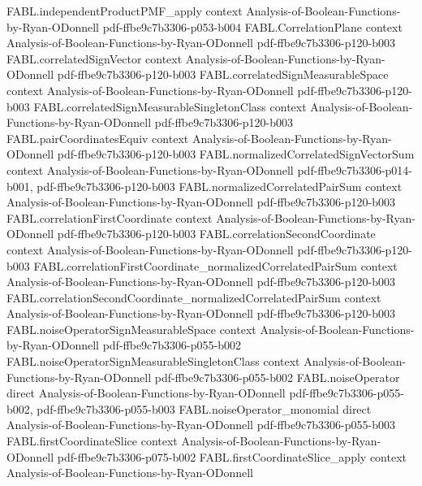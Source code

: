 \begin{theorem}
  {FABL.independentProductPMF_apply}
  {context}
  {Analysis-of-Boolean-Functions-by-Ryan-ODonnell}
  {pdf-ffbe9c7b3306-p053-b004}
\proofstep
  {FABL.CorrelationPlane}
  {context}
  {Analysis-of-Boolean-Functions-by-Ryan-ODonnell}
  {pdf-ffbe9c7b3306-p120-b003}
\proofstep
  {FABL.correlatedSignVector}
  {context}
  {Analysis-of-Boolean-Functions-by-Ryan-ODonnell}
  {pdf-ffbe9c7b3306-p120-b003}
\proofstep
  {FABL.correlatedSignMeasurableSpace}
  {context}
  {Analysis-of-Boolean-Functions-by-Ryan-ODonnell}
  {pdf-ffbe9c7b3306-p120-b003}
\proofstep
  {FABL.correlatedSignMeasurableSingletonClass}
  {context}
  {Analysis-of-Boolean-Functions-by-Ryan-ODonnell}
  {pdf-ffbe9c7b3306-p120-b003}
\proofstep
  {FABL.pairCoordinatesEquiv}
  {context}
  {Analysis-of-Boolean-Functions-by-Ryan-ODonnell}
  {pdf-ffbe9c7b3306-p120-b003}
\proofstep
  {FABL.normalizedCorrelatedSignVectorSum}
  {context}
  {Analysis-of-Boolean-Functions-by-Ryan-ODonnell}
  {pdf-ffbe9c7b3306-p014-b001,
    pdf-ffbe9c7b3306-p120-b003}
\proofstep
  {FABL.normalizedCorrelatedPairSum}
  {context}
  {Analysis-of-Boolean-Functions-by-Ryan-ODonnell}
  {pdf-ffbe9c7b3306-p120-b003}
\proofstep
  {FABL.correlationFirstCoordinate}
  {context}
  {Analysis-of-Boolean-Functions-by-Ryan-ODonnell}
  {pdf-ffbe9c7b3306-p120-b003}
\proofstep
  {FABL.correlationSecondCoordinate}
  {context}
  {Analysis-of-Boolean-Functions-by-Ryan-ODonnell}
  {pdf-ffbe9c7b3306-p120-b003}
\proofstep
  {FABL.correlationFirstCoordinate_normalizedCorrelatedPairSum}
  {context}
  {Analysis-of-Boolean-Functions-by-Ryan-ODonnell}
  {pdf-ffbe9c7b3306-p120-b003}
\proofstep
  {FABL.correlationSecondCoordinate_normalizedCorrelatedPairSum}
  {context}
  {Analysis-of-Boolean-Functions-by-Ryan-ODonnell}
  {pdf-ffbe9c7b3306-p120-b003}
\proofstep
  {FABL.noiseOperatorSignMeasurableSpace}
  {context}
  {Analysis-of-Boolean-Functions-by-Ryan-ODonnell}
  {pdf-ffbe9c7b3306-p055-b002}
\proofstep
  {FABL.noiseOperatorSignMeasurableSingletonClass}
  {context}
  {Analysis-of-Boolean-Functions-by-Ryan-ODonnell}
  {pdf-ffbe9c7b3306-p055-b002}
\proofstep
  {FABL.noiseOperator}
  {direct}
  {Analysis-of-Boolean-Functions-by-Ryan-ODonnell}
  {pdf-ffbe9c7b3306-p055-b002,
    pdf-ffbe9c7b3306-p055-b003}
\proofstep
  {FABL.noiseOperator_monomial}
  {direct}
  {Analysis-of-Boolean-Functions-by-Ryan-ODonnell}
  {pdf-ffbe9c7b3306-p055-b003}
\proofstep
  {FABL.firstCoordinateSlice}
  {context}
  {Analysis-of-Boolean-Functions-by-Ryan-ODonnell}
  {pdf-ffbe9c7b3306-p075-b002}
\proofstep
  {FABL.firstCoordinateSlice_apply}
  {context}
  {Analysis-of-Boolean-Functions-by-Ryan-ODonnell}

\end{theorem}

